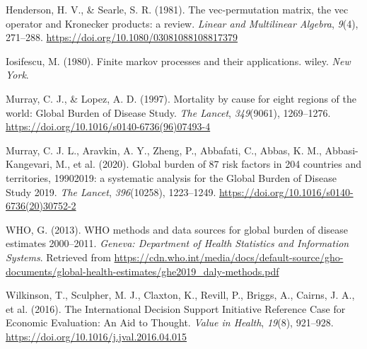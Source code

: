\documentclass[
]{agujournal2019}
\newlength{\cslhangindent}
\newenvironment{CSLReferences}[2] %
 {\begin{list}{}{%
  \setlength{\itemindent}{0pt}
  \setlength{\leftmargin}{0pt}
  \setlength{\parsep}{0pt}
  \ifodd #1
   \setlength{\leftmargin}{\cslhangindent}
   \setlength{\itemindent}{-1\cslhangindent}
  \fi
  \setlength{\itemsep}{#2\baselineskip}}}
 {\end{list}}
\begin{document}
\begin{CSLReferences}{1}{0}
Henderson, H. V., \& Searle, S. R. (1981). The vec-permutation matrix,
the vec operator and Kronecker products: a review. \emph{Linear and
Multilinear Algebra}, \emph{9}(4), 271--288.
\url{https://doi.org/10.1080/03081088108817379}

Iosifescu, M. (1980). Finite markov processes and their applications.
wiley. \emph{New York}.

Murray, C. J., \& Lopez, A. D. (1997). Mortality by cause for eight
regions of the world: Global Burden of Disease Study. \emph{The Lancet},
\emph{349}(9061), 1269--1276.
\url{https://doi.org/10.1016/s0140-6736(96)07493-4}

Murray, C. J. L., Aravkin, A. Y., Zheng, P., Abbafati, C., Abbas, K. M.,
Abbasi-Kangevari, M., et al. (2020). Global burden of 87 risk factors in
204 countries and territories, 1990{\textendash}2019: a systematic
analysis for the Global Burden of Disease Study 2019. \emph{The Lancet},
\emph{396}(10258), 1223--1249.
\url{https://doi.org/10.1016/s0140-6736(20)30752-2}

WHO, G. (2013). WHO methods and data sources for global burden of
disease estimates 2000--2011. \emph{Geneva: Department of Health
Statistics and Information Systems}. Retrieved from
\url{https://cdn.who.int/media/docs/default-source/gho-documents/global-health-estimates/ghe2019_daly-methods.pdf}

Wilkinson, T., Sculpher, M. J., Claxton, K., Revill, P., Briggs, A.,
Cairns, J. A., et al. (2016). The International Decision Support
Initiative Reference Case for Economic Evaluation: An Aid to Thought.
\emph{Value in Health}, \emph{19}(8), 921--928.
\url{https://doi.org/10.1016/j.jval.2016.04.015}

\end{CSLReferences}
\end{document}
